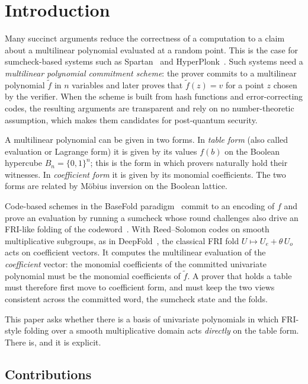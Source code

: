 \section{Introduction}\label{sec:intro}

Many succinct arguments reduce the correctness of a computation to a claim about a multilinear polynomial evaluated at a random point.
This is the case for sumcheck-based systems such as Spartan~\cite{Set20} and HyperPlonk~\cite{CBBZ23}.
Such systems need a \emph{multilinear polynomial commitment scheme}: the prover commits to a multilinear polynomial $\tilde f$ in $n$ variables and later proves that $\tilde f(z) = v$ for a point $z$ chosen by the verifier.
When the scheme is built from hash functions and error-correcting codes, the resulting arguments are transparent and rely on no number-theoretic assumption, which makes them candidates for post-quantum security.

A multilinear polynomial can be given in two forms.
In \emph{table form} (also called evaluation or Lagrange form) it is given by its values $f(b)$ on the Boolean hypercube $B_n = \{0,1\}^n$; this is the form in which provers naturally hold their witnesses.
In \emph{coefficient form} it is given by its monomial coefficients.
The two forms are related by M\"obius inversion on the Boolean lattice.

Code-based schemes in the BaseFold paradigm~\cite{ZCF24} commit to an encoding of $f$ and prove an evaluation by running a sumcheck whose round challenges also drive an FRI-like folding of the codeword~\cite{BBHR18}.
With Reed--Solomon codes on smooth multiplicative subgroups, as in DeepFold~\cite{GLHQTZ25}, the classical FRI fold $U \mapsto U_e + \theta\, U_o$ acts on coefficient vectors.
It computes the multilinear evaluation of the \emph{coefficient} vector: the monomial coefficients of the committed univariate polynomial must be the monomial coefficients of $\tilde f$.
A prover that holds a table must therefore first move to coefficient form, and must keep the two views consistent across the committed word, the sumcheck state and the folds.

This paper asks whether there is a basis of univariate polynomials in which FRI-style folding over a smooth multiplicative domain acts \emph{directly} on the table form.
There is, and it is explicit.

\subsection{Contributions}\label{sec:intro:contrib}

